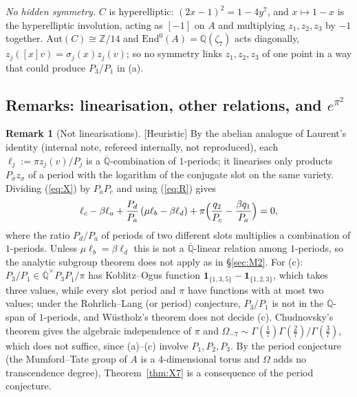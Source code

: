 \documentclass[11pt]{amsart}
\theoremstyle{definition}
\newtheorem{remark}[theorem]{Remark}
\newcommand{\Qb}{\overline{\mathbb{Q}}}
\newcommand{\Q}{\mathbb{Q}}
\newcommand{\Z}{\mathbb{Z}}
\newcommand{\lab}[1]{\textup{[#1]}}
\begin{document}
\noindent \emph{No hidden symmetry.} $C$ is hyperelliptic: $(2x-1)^2=1-4y^7$, and $x\mapsto1-x$ is the hyperelliptic
involution, acting as $[-1]$ on $A$ and multiplying $z_1,z_2,z_3$ by $-1$ together. $\mathrm{Aut}(C)\cong\Z/14$ and
$\mathrm{End}^0(A)=\Q(\zeta_7)$ acts diagonally, $z_j([x]v)=\sigma_j(x)z_j(v)$; so no symmetry links $z_1,z_2,z_3$ of one
point in a way that could produce $P_3/P_1$ in (a).

\subsection{Remarks: linearisation, other relations, and $e^{\pi^2}$}\label{sec:Xlin}
\begin{remark}[Not linearisations]\label{rem:notlin}
\lab{Heuristic} By the abelian analogue of Laurent's identity (internal note, refereed internally, not reproduced), each
$\ell_j:=\pi z_j(v)/P_j$ is a $\Qb$-combination of $1$-periods; it linearises only products $P_{\bar\sigma}z_\sigma$ of a
period with the logarithm of the conjugate slot on the same variety. Dividing (\ref{eq:X}) by $P_aP_c$ and using
(\ref{eq:R}) gives
\[
\ell_c-\beta\ell_a+\frac{P_d}{P_a}\,(\mu\ell_b-\beta\ell_d)+\pi\Bigl(\frac{q_2}{P_c}-\frac{\beta q_1}{P_a}\Bigr)=0,
\]
where the ratio $P_d/P_a$ of periods of two different slots multiplies a combination of $1$-periods. Unless
$\mu\ell_b=\beta\ell_d$ this is not a $\Qb$-linear relation among $1$-periods, so the analytic subgroup theorem does not
apply as in \S\ref{sec:M2}. For (c): $P_3/P_1\in\Qb^\times P_3P_{\bar1}/\pi$ has Koblitz--Ogus function
$\mathbf 1_{\{1,3,5\}}-\mathbf 1_{\{1,2,3\}}$, which takes three values, while every slot period and $\pi$ have functions
with at most two values; under the Rohrlich--Lang (or period) conjecture, $P_3/P_1$ is not in the $\Qb$-span of
$1$-periods, and W\"ustholz's theorem does not decide (c). Chudnovsky's theorem gives the algebraic independence of $\pi$
and $\Omega_{-7}\sim\Gamma(\frac17)\Gamma(\frac27)/\Gamma(\frac37)$, which does not suffice, since (a)--(c) involve
$P_1,P_2,P_3$. By the period conjecture (the Mumford--Tate group of $A$ is a $4$-dimensional torus and $\Omega$ adds no
transcendence degree), Theorem~\ref{thm:X7} is a consequence of the period conjecture.
\end{remark}
\end{document}
